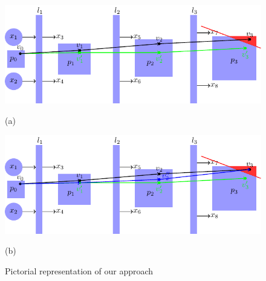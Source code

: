 \begin{figure}
    \begin{minipage}{0.9\textwidth}
        \centering
        \includegraphics[scale=0.8]{fig/pictorial1.pdf}
        
        (a)
    \end{minipage}

    \begin{minipage}{0.9\textwidth}
        \centering
        \includegraphics[scale=0.8]{fig/pictorial2.pdf}

        (b)
    \end{minipage}
    \caption{Pictorial representation of our approach}
    \label{fig:pictorial}
\end{figure}


